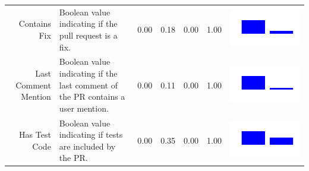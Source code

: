 \documentclass[conference]{IEEEtran}
\begin{document}
\begin{table}[ht]
\begin{tabular}{rp{26em}rrrrc}
    Contains Fix & Boolean value indicating if the pull request is a fix. & 0.00 & 0.18 & 0.00 & 1.00 & \includegraphics[scale = 0.1, clip = true, trim= 50px 60px 50px 60px]{../figs/hist-features/hist-containsFix.pdf} \\
    Last Comment Mention & Boolean value indicating if the last comment of the PR contains a user mention. & 0.00 & 0.11 & 0.00 & 1.00 & \includegraphics[scale = 0.1, clip = true, trim= 50px 60px 50px 60px]{../figs/hist-features/hist-lastCommentMention.pdf} \\
    Has Test Code & Boolean value indicating if tests are included by the PR. & 0.00 & 0.35 & 0.00 & 1.00 & \includegraphics[scale = 0.1, clip = true, trim= 50px 60px 50px 60px]{../figs/hist-features/hist-hasTestCode.pdf} \\

\end{tabular}
\end{table}
\end{document}
